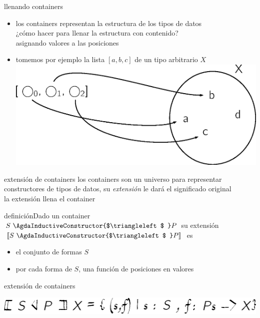 \documentclass[9pt]{beamer}
\newcommand{\saltar}{\vspace{1ex}}
\begin{document}
\begin{frame}{llenando containers}
  \begin{itemize}
  \item los containers representan la \alert{estructura} de los tipos de datos\\ ¿cómo hacer para llenar la estructura con contenido? \\
    \pause
    \alert{asignando valores a las posiciones}\pause
  \item tomemos por ejemplo la lista $[a, b, c]$ de un tipo arbitrario $X$\\ \saltar\saltar
    \includegraphics[scale=0.5]{img/listext.eps}
  \end{itemize}
\end{frame}

\begin{frame}{extensión de containers}
  los containers son un universo para representar constructores de tipos de datos, su \emph{extensión} le dará el significado original\\\saltar
  la extensión \alert{llena} el container\pause
    \begin{block}{definición}Dado un container $S\ \AgdaInductiveConstructor{$\triangleleft$ } P$ su \alert{extensión}
      $\llbracket S\ \AgdaInductiveConstructor{$\triangleleft$ } P \rrbracket $ es
      \begin{itemize}
      \item el conjunto de formas $S$
      \item por cada forma de $S$, una función de posiciones en valores
      \end{itemize}
      \end{block}
    \begin{exampleblock}{extensión de containers}
    \end{exampleblock}
    \begin{center}\includegraphics[scale=0.5]{img/ext.eps}
    \end{center}
\end{frame}
\end{document}
